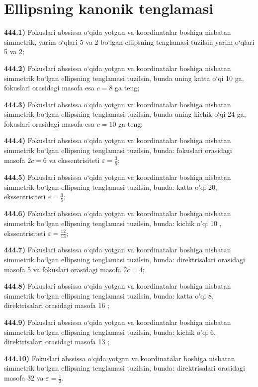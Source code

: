 \section{Ellipsning kanonik tenglamasi}


\textbf{444.1)} Fokuslari abssissa o‘qida yotgan va koordinatalar boshiga nisbatan simmetrik, yarim o‘qlari 5 va 2 bo‘lgan ellipsning tenglamasi tuzilsin yarim o‘qlari 5 va 2;

\textbf{444.2)} Fokuslari abssissa o‘qida yotgan va koordinatalar boshiga nisbatan simmetrik bo‘lgan ellipsning tenglamasi tuzilsin, bunda uning katta o‘qi 10 ga, fokuslari orasidagi masofa esa $c = 8$ ga teng;

\textbf{444.3)} Fokuslari abssissa o‘qida yotgan va koordinatalar boshiga nisbatan simmetrik bo‘lgan ellipsning tenglamasi tuzilsin, bunda uning kichik o‘qi 24 ga, fokuslari orasidagi masofa esa $c = 10$ ga teng;

\textbf{444.4)} Fokuslari abssissa o‘qida yotgan va koordinatalar boshiga nisbatan simmetrik bo‘lgan ellipsning tenglamasi tuzilsin, bunda: fokuslari orasidagi masofa $2 c=6$ va ekssentrisiteti $\varepsilon=\frac{3}{5}$;

\textbf{444.5)} Fokuslari abssissa o‘qida yotgan va koordinatalar boshiga nisbatan simmetrik bo‘lgan ellipsning tenglamasi tuzilsin, bunda: katta o'qi 20, ekssentrisiteti $\varepsilon=\frac{3}{5}$;

\textbf{444.6)} Fokuslari abssissa o‘qida yotgan va koordinatalar boshiga nisbatan simmetrik bo‘lgan ellipsning tenglamasi tuzilsin, bunda: kichik o'qi 10 , ekssentrisiteti $\varepsilon=\frac{12}{13}$;

\textbf{444.7)} Fokuslari abssissa o‘qida yotgan va koordinatalar boshiga nisbatan simmetrik bo‘lgan ellipsning tenglamasi tuzilsin, bunda: direktrisalari orasidagi masofa 5 va fokuslari orasidagi masofa $2 c=4$;

\textbf{444.8)} Fokuslari abssissa o‘qida yotgan va koordinatalar boshiga nisbatan simmetrik bo‘lgan ellipsning tenglamasi tuzilsin, bunda: katta o'qi 8, direktrisalari orasidagi masofa 16 ;

\textbf{444.9)} Fokuslari abssissa o‘qida yotgan va koordinatalar boshiga nisbatan simmetrik bo‘lgan ellipsning tenglamasi tuzilsin, bunda: kichik o'qi 6, direktrisalari orasidagi masofa 13 ;

\textbf{444.10)} Fokuslari abssissa o‘qida yotgan va koordinatalar boshiga nisbatan simmetrik bo‘lgan ellipsning tenglamasi tuzilsin, bunda: direktrisalari orasidagi masofa 32 va $\varepsilon=\frac{1}{2}$.

